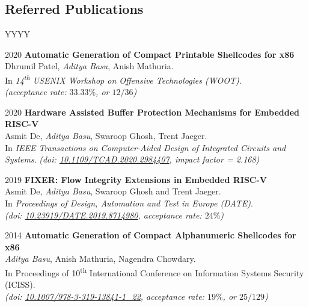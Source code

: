 \documentclass[margin]{res}
\newcommand{\doi}[1]{\href{http://dx.doi.org/#1}{#1}}
\begin{document}
\begin{resume}
\section{Referred Publications}

\begin{labeling}{YYYY}
\item[2020]
    \textbf{Automatic Generation of Compact Printable Shellcodes for x86}\\
    Dhrumil Patel, \emph{Aditya Basu}, Anish Mathuria.\\
    In \emph{14\textsuperscript{th} USENIX Workshop on Offensive Technologies ({WOOT})}.\\
    {\itshape (acceptance rate: $33.33\%$, or $12/36$)}

\item[2020]
    \textbf{Hardware Assisted Buffer Protection Mechanisms for Embedded RISC-V}\\
    Asmit De, \emph{Aditya Basu}, Swaroop Ghosh, Trent Jaeger.\\
    In \emph{IEEE Transactions on Computer-Aided Design of Integrated Circuits and Systems}.
    {\itshape (doi: \doi{10.1109/TCAD.2020.2984407}, impact factor = 2.168)}

\item[2019]
    \textbf{FIXER: Flow Integrity Extensions in Embedded RISC-V}\\
    Asmit De, \emph{Aditya Basu}, Swaroop Ghosh and Trent Jaeger.\\
    In \emph{Proceedings of Design, Automation and Test in Europe (DATE)}.\\
    {\itshape (doi: \doi{10.23919/DATE.2019.8714980}, acceptance rate: $24\%$)}

\item[2014]
    \textbf{Automatic Generation of Compact Alphanumeric Shellcodes for x86}\\
    \emph{Aditya Basu}, Anish Mathuria, Nagendra Chowdary.\\
    In Proceedings of 10\textsuperscript{th} International Conference on Information Systems Security (ICISS).\\
    {\itshape (doi: \doi{10.1007/978-3-319-13841-1\_22}, acceptance rate: $19\%$, or $25/129$)}
\end{labeling}


\end{resume}
\end{document}
